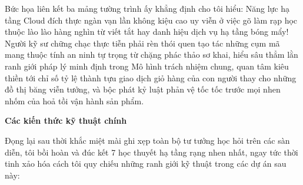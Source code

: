 Bức họa liên kết ba mảng tường trình ấy khẳng định cho tôi hiểu: Năng
lực hạ tầng Cloud đích thực ngàn vạn lần không kiệu cao uy viễn ở việc
gõ làm rạp học thuộc lào lào hàng nghìn từ viết tắt hay danh hiệu dịch
vụ hạ tầng bóng mẩy! Người kỹ sư chững chạc thực tiễn phải rèn thói quen
tạo tác những cụm mã mang thuộc tính an ninh tự trọng từ chặng phác thảo
sơ khai, hiểu sâu thẳm lằn ranh giới pháp lý minh định trong Mô hình
trách nhiệm chung, quan tâm kiêu thiền tới chỉ số tỷ lệ thành tựu giao
dịch giỏ hàng của con người thay cho những đồ thị băng viễn tưởng, và
bộc phát kỷ luật phản vệ tốc tốc trước mọi nhen nhốm của hoả tồi vận
hành sản phẩm.

\vspace{0.5em}\noindent\textbf{Các kiến thức kỹ thuật
chính}\par

Đọng lại sau thời khắc miệt mài ghi xẹp toàn bộ tư tưởng học hỏi trên
các sàn diễn, tôi bồi hoàn và đúc kết 7 học thuyết hạ tầng rạng nhen
nhất, ngay tức thời tinh xảo hóa cách tôi quy chiếu những ranh giới kỹ
thuật trong các dự án sau này:

